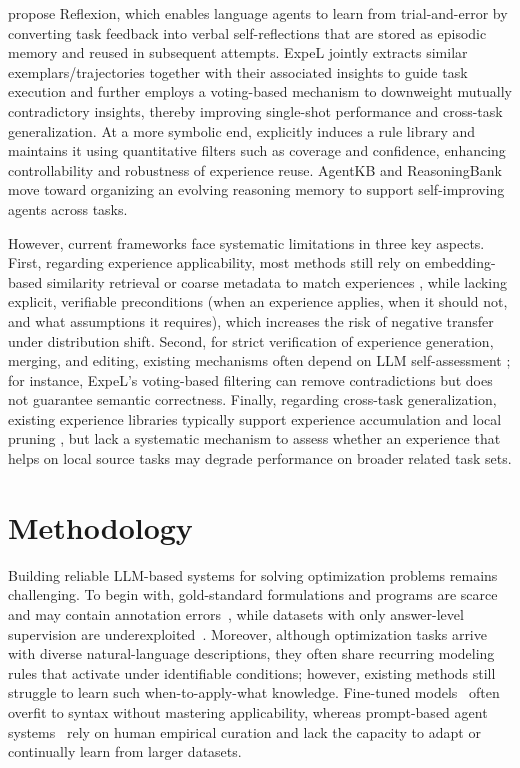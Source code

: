 \documentclass[sigconf, nonacm]{acmart}
\begin{document}
\citet{shinn2023reflexion} propose Reflexion, which enables language agents to learn from trial-and-error by converting task feedback into verbal self-reflections that are stored as episodic memory and reused in subsequent attempts. ExpeL \citep{zhao2023expel} jointly extracts similar exemplars/trajectories together with their associated insights to guide task execution and further employs a voting-based mechanism to downweight mutually contradictory insights, thereby improving single-shot performance and cross-task generalization.
At a more symbolic end, \citet{zhu2023llmrules} explicitly induces a rule library and maintains it using quantitative filters such as coverage and confidence, enhancing controllability and robustness of experience reuse. AgentKB \citep{tang2025agentkb} and ReasoningBank \citep{ ouyang2025reasoningbank} move toward organizing an evolving reasoning memory to support self-improving agents across tasks.

However, current frameworks face systematic limitations in three key aspects. First, regarding experience applicability, most methods still rely on embedding-based similarity retrieval or coarse metadata to match experiences \citep{zhao2023expel, park2023generative, wang2024awm}, while lacking explicit, verifiable preconditions (when an experience applies, when it should not, and what assumptions it requires), which increases the risk of negative transfer under distribution shift. Second, for strict verification of experience generation, merging, and editing, existing mechanisms often depend on LLM self-assessment \citep{zhao2023expel, shinn2023reflexion, feng2025agentrr}; for instance, ExpeL's voting-based filtering can remove contradictions but does not guarantee semantic correctness. Finally, regarding cross-task generalization, existing experience libraries typically support experience accumulation and local pruning \citep{zhao2023expel, tang2025agentkb, ouyang2025reasoningbank}, but lack a systematic mechanism to assess whether an experience that helps on local source tasks may degrade performance on broader related task sets.


\section{Methodology}
\label{sec:method}
Building reliable LLM-based systems for solving optimization problems remains challenging. To begin with, gold-standard formulations and programs are scarce and may contain annotation errors~\citep{JiangShu2025llmopt, yang2025orthought}, while datasets with only answer-level supervision are underexploited~\citep{huang2024mamo,huang2025orlm,lu2025optmath}. Moreover, although optimization tasks arrive with diverse natural-language descriptions, they often share recurring modeling rules that activate under identifiable conditions; however, existing methods still struggle to learn such when-to-apply-what knowledge. Fine-tuned models~\citep{huang2025orlm, JiangShu2025llmopt} often overfit to syntax without mastering applicability, whereas prompt-based agent systems~\citep{ahmaditeshnizi2024optimus, xiao2023chain, yang2025orthought} rely on human empirical curation and lack the capacity to adapt or continually learn from larger datasets.
\end{document}
